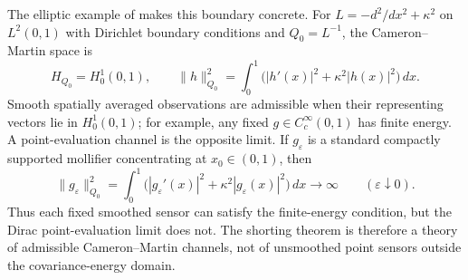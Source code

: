 The elliptic example of  makes this boundary concrete.  For
$L=-d^2/dx^2+\kappa^2$ on $L^2(0,1)$ with Dirichlet boundary conditions and
$Q_0=L^{-1}$, the Cameron--Martin space is
\[
  H_{Q_0}=H_0^1(0,1),
  \qquad
  \|h\|_{Q_0}^2
  =
  \int_0^1\bigl(|h'(x)|^2+\kappa^2|h(x)|^2\bigr)\,dx .
\]
Smooth spatially averaged observations are admissible when their representing
vectors lie in $H_0^1(0,1)$; for example, any fixed
$g\in C_c^\infty(0,1)$ has finite energy.  A point-evaluation channel is the
opposite limit.  If $g_\varepsilon$ is a standard compactly supported mollifier
concentrating at $x_0\in(0,1)$, then
\[
  \|g_\varepsilon\|_{Q_0}^2
  =
  \int_0^1\bigl(|g_\varepsilon'(x)|^2+\kappa^2|g_\varepsilon(x)|^2\bigr)\,dx
  \longrightarrow \infty
  \qquad(\varepsilon\downarrow0).
\]
Thus each fixed smoothed sensor can satisfy the finite-energy condition, but
the Dirac point-evaluation limit does not.  The shorting theorem is therefore a
theory of admissible Cameron--Martin channels, not of unsmoothed point sensors
outside the covariance-energy domain.
